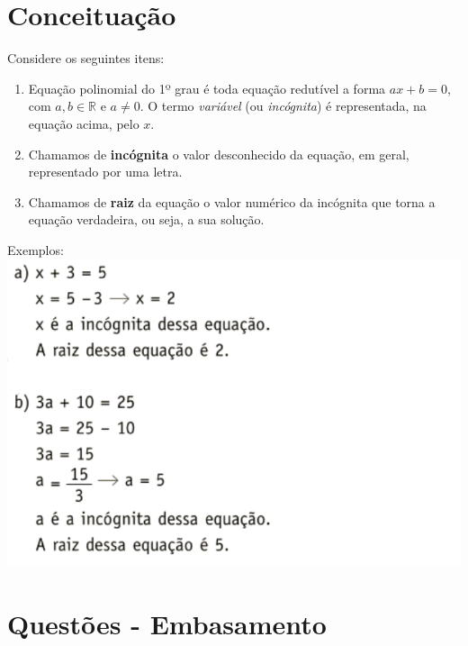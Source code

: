 \documentclass[a4paper,12pt]{article}
\begin{document}
	\section*{Conceituação}

		Considere os seguintes itens:

		\begin{enumerate}
			\item Equação polinomial do 1º grau é toda equação redutível a forma $ax+b=0$, com $a, b \in \mathbb{R}$ e $a \neq 0$. O termo \textit{variável} (ou \textit{incógnita}) é representada, na equação acima, pelo $x$. 
			
			\item Chamamos de \textbf{incógnita} o valor desconhecido da equação, em geral, representado
			por uma letra. \\

			\item Chamamos de \textbf{raiz} da equação o valor numérico da incógnita que torna a equação verdadeira,
			ou seja, a sua solução. \\
		\end{enumerate} 

		Exemplos: \\

		\includegraphics[scale=0.5]{def.png}

		\section*{Questões - Embasamento}
        
\end{document}
